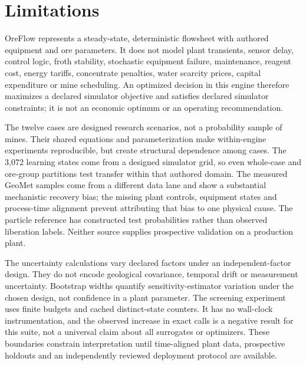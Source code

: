 \documentclass[10pt]{article}
\begin{document}
\section{Limitations}\label{limitations}

OreFlow represents a steady-state, deterministic flowsheet with authored
equipment and ore parameters. It does not model plant transients, sensor
delay, control logic, froth stability, stochastic equipment failure,
maintenance, reagent cost, energy tariffs, concentrate penalties, water
scarcity prices, capital expenditure or mine scheduling. An optimized
decision in this engine therefore maximizes a declared simulator
objective and satisfies declared simulator constraints; it is not an
economic optimum or an operating recommendation.

The twelve cases are designed research scenarios, not a probability
sample of mines. Their shared equations and parameterization make
within-engine experiments reproducible, but create structural dependence
among cases. The 3,072 learning states come from a designed simulator
grid, so even whole-case and ore-group partitions test transfer within
that authored domain. The measured GeoMet samples come from a different
data lane and show a substantial mechanistic recovery bias; the missing
plant controls, equipment states and process-time alignment prevent
attributing that bias to one physical cause. The particle reference has
constructed test probabilities rather than observed liberation labels.
Neither source supplies prospective validation on a production plant.

The uncertainty calculations vary declared factors under an
independent-factor design. They do not encode geological covariance,
temporal drift or measurement uncertainty. Bootstrap widths quantify
sensitivity-estimator variation under the chosen design, not confidence
in a plant parameter. The screening experiment uses finite budgets and
cached distinct-state counters. It has no wall-clock instrumentation,
and the observed increase in exact calls is a negative result for this
suite, not a universal claim about all surrogates or optimizers. These
boundaries constrain interpretation until time-aligned plant data,
prospective holdouts and an independently reviewed deployment protocol
are available.
\end{document}
